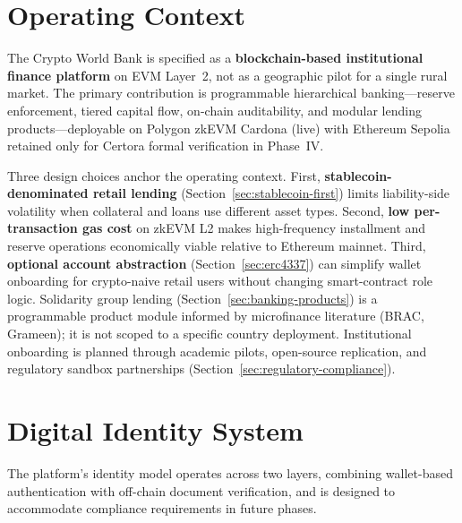 \documentclass[12pt,a4paper]{report}
\begin{document}
\section{Operating Context}
\label{sec:operating-context}

The Crypto World Bank is specified as a \textbf{blockchain-based institutional finance platform} on EVM Layer~2, not as a geographic pilot for a single rural market. The primary contribution is programmable hierarchical banking---reserve enforcement, tiered capital flow, on-chain auditability, and modular lending products---deployable on Polygon zkEVM Cardona (live) with Ethereum Sepolia retained only for Certora formal verification in Phase~IV.

Three design choices anchor the operating context. First, \textbf{stablecoin-denominated retail lending} (Section~\ref{sec:stablecoin-first}) limits liability-side volatility when collateral and loans use different asset types. Second, \textbf{low per-transaction gas cost} on zkEVM L2 makes high-frequency installment and reserve operations economically viable relative to Ethereum mainnet. Third, \textbf{optional account abstraction} (Section~\ref{sec:erc4337}) can simplify wallet onboarding for crypto-naive retail users without changing smart-contract role logic. Solidarity group lending (Section~\ref{sec:banking-products}) is a programmable product module informed by microfinance literature (BRAC, Grameen); it is not scoped to a specific country deployment. Institutional onboarding is planned through academic pilots, open-source replication, and regulatory sandbox partnerships (Section~\ref{sec:regulatory-compliance}).

\section{Digital Identity System}

The platform's identity model operates across two layers, combining wallet-based authentication with off-chain document verification, and is designed to accommodate compliance requirements in future phases.
\end{document}
